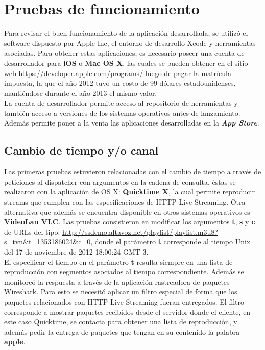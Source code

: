 
\chapter{Pruebas de funcionamiento}

Para revisar el buen funcionamiento de la aplicación desarrollada, se utilizó el software dispuesto por Apple Inc,  el entorno de desarrollo Xcode y herramientas asociadas. Para obtener estas aplicaciones, es necesario poseer una cuenta de desarrollador para \textbf{iOS} o \textbf{Mac OS X}, las cuales se pueden obtener en el sitio web \url{https://developer.apple.com/programs/} luego de pagar la matrícula impuesta, la que el año 2012 tuvo un costo de 99 dólares estadounidenses, mantiéndose durante el año 2013 el mismo valor.\\

La cuenta de desarrollador permite acceso al repositorio de herramientas \cite{apple-repositorio} y también acceso a versiones de los sistemas operativos antes de lanzamiento.
Además permite poner a la venta las aplicaciones desarrolladas en la \textit{\textbf{App Store}}\cite{apple-appstore}.

\section{Cambio de tiempo y/o canal}

Las primeras pruebas estuvieron relacionadas con el cambio de tiempo a través de peticiones al dispatcher con argumentos en la cadena de consulta, éstas se realizaron con la aplicación de OS X: \textbf{Quicktime X}, la cual permite reproducir streams que cumplen con las especificaciones de HTTP Live Streaming. Otra alternativa que además se encuentra disponible en otros sistemas operativos es \textbf{VideoLan VLC}. Las pruebas consistieron en modificar los argumentos \textbf{t}, \textbf{s} y \textbf{c} de URLs del tipo:
\url{http://ssdemo.altavoz.net/playlist/playlist.m3u8?s=tvn&t=1353186024&c=0}, donde el parámetro \textbf{t} corresponde al tiempo Unix del 17 de noviembre de 2012 18:00:24 GMT-3.\\

El especificar el tiempo en el parámetro \textbf{t} resulta siempre en una lista de reproducción con segmentos asociados al tiempo correspondiente. Además se monitoreó la respuesta a través de la aplicación rastreadora de paquetes Wireshark. Para esto se necesitó aplicar un filtro especial de forma que los paquetes relacionados con HTTP Live Streaming fueran entregados. El filtro corresponde a mostrar paquetes recibidos desde el servidor donde el cliente, en este caso Quicktime, se contacta para obtener una lista de reproducción, y además pedir la entrega de paquetes que tengan en su contenido la palabra \textbf{apple}.

